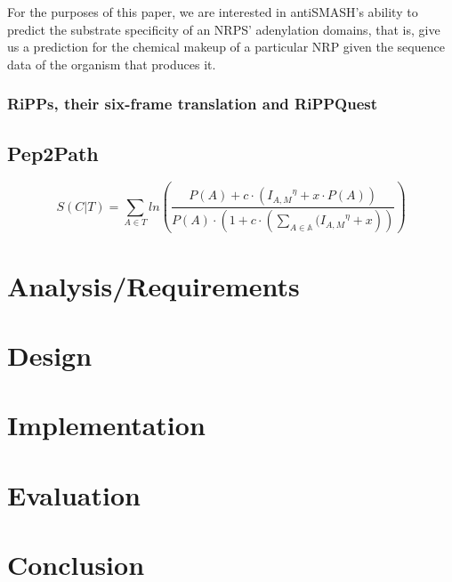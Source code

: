 \documentclass{l4proj}
\newcommand{\scoreeqn}{\[S(C|T) = \sum_{A \in T}{ln\left(\dfrac{
												    P(A) + c\cdot ({I_{A, M}}^\eta + x\cdot {P(A)})
												    }{P(A)\cdot(1 + c \cdot (\sum_{A \in \mathbb{A}}{({I_{A, M}}^\eta} + x))
												    }\right)}\]}
\begin{document}
For the purposes of this paper, we are interested in antiSMASH's ability to predict the substrate specificity of an NRPS' adenylation domains, that is, give us a prediction for the chemical makeup of a particular NRP given the sequence data of the organism that produces it.

\subsection{RiPPs, their six-frame translation and RiPPQuest}

\section{Pep2Path}

\scoreeqn

\chapter{Analysis/Requirements}

\chapter{Design}

\chapter{Implementation}

\chapter{Evaluation} 

\chapter{Conclusion}    
\end{document}
